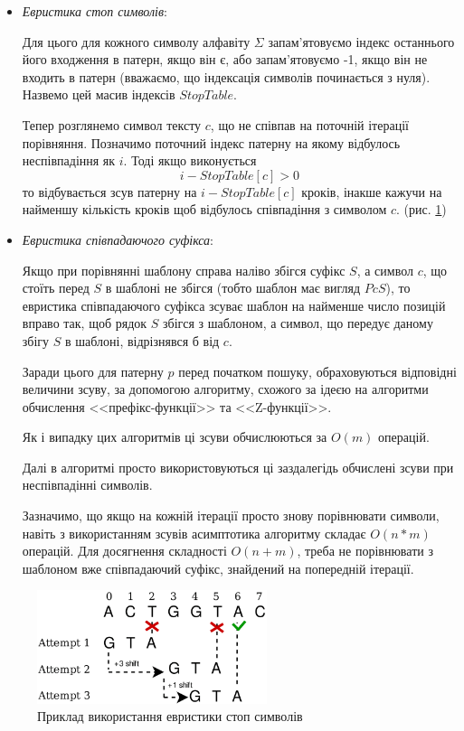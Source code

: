 \documentclass[a4paper,14pt]{extarticle} %
\begin{document}
\begin{itemize}
	\item \textit{Евристика стоп символів}:
	
	Для цього для кожного символу алфавіту $\Sigma$ запам'ятовуємо індекс останнього його входження в патерн, якщо він є, або запам'ятовуємо -1, якщо він не входить в патерн (вважаємо, що індексація символів починається з нуля). 
	Назвемо цей масив індексів $StopTable$.
	
	Тепер розглянемо символ тексту $c$, що не співпав на поточній ітерації порівняння. Позначимо поточний індекс патерну на якому відбулось неспівпадіння як $i$.
	Тоді якщо виконується \[i-StopTable[c] > 0\] то відбувається зсув патерну на $i-StopTable[c]$ кроків, інакше кажучи на найменшу кількість кроків щоб відбулось співпадіння з символом $c$. (рис. \ref{fig:boyer_moore})
	\item \textit{Евристика співпадаючого суфікса}:
	
	Якщо при порівнянні шаблону справа наліво збігся суфікс \( S \), а символ \( c \), що стоїть перед \( S \) в шаблоні не збігся (тобто шаблон має вигляд \( PcS \)),
 	то евристика співпадаючого суфікса зсуває шаблон на найменше число позицій вправо так, щоб рядок \( S \) збігся з шаблоном, а символ, що передує даному збігу \( S \) в шаблоні, відрізнявся б від \( c \).
	
	Заради цього для патерну $p$ перед початком пошуку, обраховуються відповідні величини зсуву, за допомогою алгоритму,
	схожого за ідеєю на алгоритми обчислення <<префікс-функції>> та <<Z-функції>>.

	Як і випадку цих алгоритмів ці зсуви обчислюються за $O(m)$ операцій.
	
	Далі в алгоритмі просто використовуються ці заздалегідь обчислені зсуви при неспівпадінні символів.

	Зазначимо, що якщо на кожній ітерації просто знову порівнювати символи, навіть з використанням зсувів асимптотика алгоритму
	складає $O(n*m)$ операцій. Для досягнення складності $O(n+m)$, треба не порівнювати з шаблоном вже співпадаючий суфікс, знайдений на попередній ітерації.

\end{itemize}
	\begin{figure}[H] %
		\centering %
		\includegraphics[width=0.6\textwidth]{images/boyer_moore.png} %
		\caption{Приклад використання евристики стоп символів} %
		\label{fig:boyer_moore} %
	\end{figure}
\end{document}
